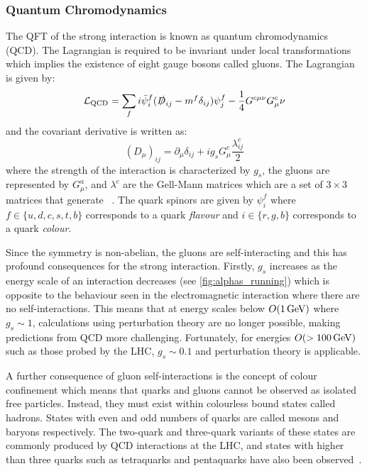 \subsubsection{Quantum Chromodynamics}
The QFT of the strong interaction is known as quantum chromodynamics (QCD). The Lagrangian is required to be invariant under local  transformations which implies the existence of eight gauge bosons called gluons. The Lagrangian is given by:
\begin{equation}
  \mathcal{L}_\mathrm{QCD} = \sum_f i \bar{\psi}^f_i (\slashed{D}_{ij} -m^f \delta_{ij})\psi^f_j - \frac{1}{4} G^{c\mu\nu} G^c_\mu\nu
  \label{eq:qcd_lagrangian}
\end{equation}
and the covariant derivative is written as:
\begin{equation}
  (D_\mu)_{ij} = \partial_\mu \delta_{ij} + i g_s G^c_\mu \frac{\lambda^c_{ij}}{2}
\end{equation}
where the strength of the interaction is characterized by $g_s$, the gluons are represented by $G^a_\mu$, and $\lambda^c$ are the Gell-Mann matrices which are a set of $3\times3$ matrices that generate ~\cite{Thomson:2013zua}. The quark spinors are given by $\psi^f_i$ where $f \in \{u, d, c, s, t, b\}$ corresponds to a quark \textit{flavour} and $i \in \{r, g, b\}$ corresponds to a quark \textit{colour}. 

Since the  symmetry is non-abelian, the gluons are self-interacting and this has profound consequences for the strong interaction. Firstly, $g_s$ increases as the energy scale of an interaction decreases (see \cref{fig:alphas_running}) which is opposite to the behaviour seen in the electromagnetic interaction where there are no self-interactions. This means that at energy scales below $O(1\,\text{Ge\hspace{-.08em}V})$ where $g_s \sim 1$, calculations using perturbation theory are no longer possible, making predictions from QCD more challenging. Fortunately, for energies $O(>100\,\text{Ge\hspace{-.08em}V})$ such as those probed by the LHC, $g_s \sim 0.1$ and perturbation theory is applicable.

A further consequence of gluon self-interactions is the concept of colour confinement which means that quarks and gluons cannot be observed as isolated free particles. Instead, they must exist within colourless bound states called hadrons. States with even and odd numbers of quarks are called mesons and baryons respectively. The two-quark and three-quark variants of these states are commonly produced by QCD interactions at the LHC, and states with higher than three quarks such as tetraquarks and pentaquarks have also been observed~\cite{Liu:2019zoy}.

